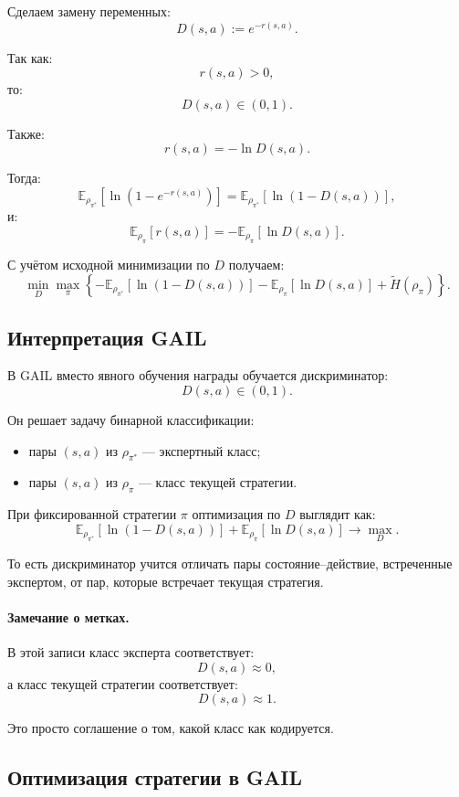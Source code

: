 \documentclass[12pt,a4paper]{article}
\begin{document}
Сделаем замену переменных:
\[
D(s,a)
:=
e^{-r(s,a)}.
\]

Так как:
\[
r(s,a)>0,
\]
то:
\[
D(s,a)\in(0,1).
\]

Также:
\[
r(s,a)
=
-\ln D(s,a).
\]

Тогда:
\[
\mathbb E_{\rho_{\pi^\ast}}
\left[
\ln(1-e^{-r(s,a)})
\right]
=
\mathbb E_{\rho_{\pi^\ast}}
\left[
\ln(1-D(s,a))
\right],
\]
и:
\[
\mathbb E_{\rho_\pi}
\left[
r(s,a)
\right]
=
-
\mathbb E_{\rho_\pi}
\left[
\ln D(s,a)
\right].
\]

С учётом исходной минимизации по $D$ получаем:
\[
\min_D
\max_\pi
\left\{
-
\mathbb E_{\rho_{\pi^\ast}}
\left[
\ln(1-D(s,a))
\right]
-
\mathbb E_{\rho_\pi}
\left[
\ln D(s,a)
\right]
+
\widetilde H(\rho_\pi)
\right\}.
\]

\subsection{Интерпретация GAIL}

В GAIL вместо явного обучения награды обучается дискриминатор:
\[
D(s,a)\in(0,1).
\]

Он решает задачу бинарной классификации:
\begin{itemize}
    \item пары $(s,a)$ из $\rho_{\pi^\ast}$ --- экспертный класс;
    \item пары $(s,a)$ из $\rho_\pi$ --- класс текущей стратегии.
\end{itemize}

При фиксированной стратегии $\pi$ оптимизация по $D$ выглядит как:
\[
\mathbb E_{\rho_{\pi^\ast}}
\left[
\ln(1-D(s,a))
\right]
+
\mathbb E_{\rho_\pi}
\left[
\ln D(s,a)
\right]
\to
\max_D.
\]

То есть дискриминатор учится отличать пары состояние--действие, встреченные экспертом, от пар, которые встречает текущая стратегия.

\paragraph{Замечание о метках.}

В этой записи класс эксперта соответствует:
\[
D(s,a)\approx 0,
\]
а класс текущей стратегии соответствует:
\[
D(s,a)\approx 1.
\]

Это просто соглашение о том, какой класс как кодируется.

\subsection{Оптимизация стратегии в GAIL}
\end{document}
